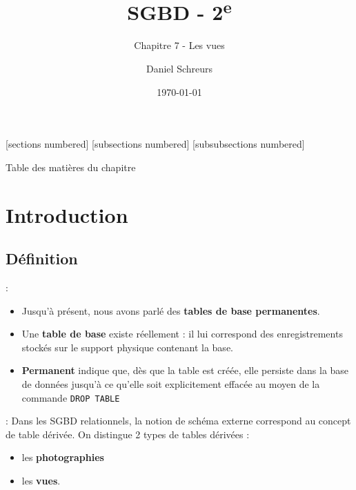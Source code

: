 \documentclass[10pt]{beamer}
\title{SGBD - 2\textsuperscript{e}}
\subtitle{Chapitre 7 - Les vues}
\date{\today}
\author{Daniel Schreurs}
\institute{Haute École de la Province de Liège}
\begin{document}
\maketitle

[sections numbered]
[subsections numbered]
[subsubsections numbered]
\begin{frame}[allowframebreaks]{Table des matières du chapitre}
    \tableofcontents[subsectionstyle=show/show/hide,subsubsectionstyle=show/show/hide,]
\end{frame}

\section{Introduction}
\tocss
\subsection{Définition}
\begin{frame}{\secname : \subsecname}
    \begin{itemize}
        \item Jusqu'à présent, nous avons parlé des \textbf{tables de base permanentes}.
        \item Une \textbf{table de base} existe réellement : il lui correspond des enregistrements stockés sur le support physique contenant la base.
        \item \textbf{Permanent} indique que, dès que la table est créée, elle persiste dans la base de données jusqu'à ce qu'elle soit explicitement effacée au moyen de la commande \lstinline[language=plsql]!DROP TABLE!
    \end{itemize}
\end{frame}

\begin{frame}{\secname : \subsecname}
    Dans les SGBD relationnels, la notion de schéma externe correspond au concept de table dérivée.  On distingue 2 types de tables dérivées :
    \begin{itemize}
        \item les \textbf{photographies}
        \item les \textbf{vues}.
    \end{itemize}
\end{frame}
\end{document}
